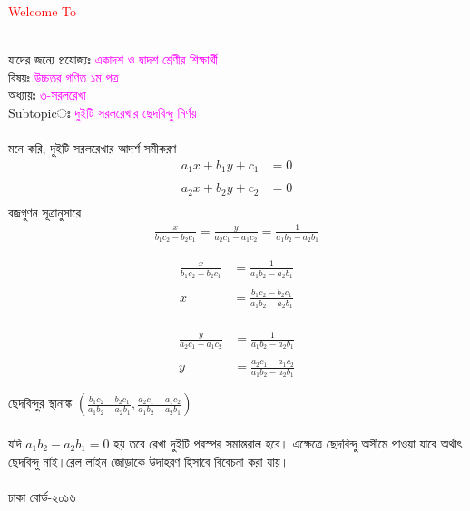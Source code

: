 \documentclass{article}
\begin{document}
 
	\Large
	\textcolor{red}{Welcome To} 
	\\
	\\
	যাদের জন্যে প্রযোজ্যঃ  	\textcolor{magenta}{একাদশ ও দ্বাদশ শ্রেণীর শিক্ষার্থী} \\
	বিষয়ঃ \textcolor{magenta}{উচ্চতর গণিত ১ম পত্র} \\
	অধ্যায়ঃ \textcolor{magenta}{৩-সরলরেখা}\\ 
	Subtopicঃ  \textcolor{magenta}{ দুইটি সরলরেখার ছেদবিন্দু নির্ণয় }\\
	\\
	মনে করি, দুইটি সরলরেখার আদর্শ সমীকরণ \\ 
		\begin{align*}
			a_1x+b_1y+c_1&=0\\
			\\
			a_2x+b_2y+c_2&=0\\
		\end{align*}
		বজ্রগুণন সূত্রানুসারে\\ 		
		\begin{align*}
			\frac{x}{b_1c_2-b_2c_1}=\frac{y}{a_2c_1-a_1c_2}=\frac{1}{a_1b_2-a_2b_1}
		\end{align*}
	\begin{multicols}{2}
		\begin{align*}
		\frac{x}{b_1c_2-b_2c_1}&=\frac{1}{a_1b_2-a_2b_1}\\
		\\
		x&=\frac{b_1c_2-b_2c_1}{a_1b_2-a_2b_1}
	\end{align*}
	\\
	\begin{align*}
		\frac{y}{a_2c_1-a_1c_2}&=\frac{1}{a_1b_2-a_2b_1}\\
		\\
		y&=\frac{a_2c_1-a_1c_2}{a_1b_2-a_2b_1}
	\end{align*}
	\end{multicols}
ছেদবিন্দুর স্থানাঙ্ক $\left(\frac{b_1c_2-b_2c_1}{a_1b_2-a_2b_1},\frac{a_2c_1-a_1c_2}{a_1b_2-a_2b_1}\right)$\\ 
\\
যদি $a_1b_2-a_2b_1=0$ হয়  তবে রেখা দুইটি পরস্পর সমান্তরাল হবে। এক্ষেত্রে ছেদবিন্দু অসীমে পাওয়া যাবে অর্থাৎ ছেদবিন্দু নাই।রেল লাইন জোড়াকে উদাহরণ হিসাবে বিবেচনা করা যায়। \\
\\
ঢাকা বোর্ড-২০১৬\\ 
\end{document}
